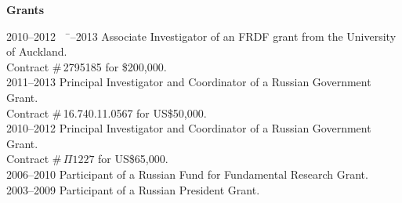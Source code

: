 \documentclass[12pt]{article}
\begin{document}
\centerline{\bf Grants}

\begin{tabbing}
2010--2012 \ \ \= --2013       \> Associate Investigator of an FRDF grant from the University of Auckland.\\
		\> Contract \#\,2795185 for \$200,000.\\
2011--2013       \> Principal Investigator and Coordinator of a Russian Government Grant.\\
		 \> Contract \#\,16.740.11.0567 for US\$50,000.\\
2010--2012       \> Principal Investigator and Coordinator of a Russian Government Grant.\\
		 \> Contract \#\,$\Pi1227$ for US\$65,000.\\
2006--2010       \> Participant of a Russian Fund for Fundamental Research Grant.\\
2003--2009      \> Participant of a Russian President Grant.\\
\end{tabbing}

\iftoggle{full}{
\centerline{\bf Travel Grants}
\begin{tabbing}
2010--2012 \ \ \= \kill
2012--2013        \> School of Computing, National University of Singapore\\
2011                  \> University of Chicago, University of Wisconsin--Madison, and Cornell University\\
2011                  \> Participation in the Logic Colloquium 2011\\
2010                  \> Participation in the Logic Colloquium 2010\\
2010                  \> Participation in the Computability in Europe 2010\\
2009                  \> University of Notre Dame, Cornell University, and NYC University\\
2009                  \> Participation in the Logic Colloquium 2009\\
2008                  \> Participation in the Computability in Europe 2008\\
2008                  \> Participation in the Summer School Marktoberdorf 2008\\
2007                  \> Participation in the Logic Colloquium 2007\\
2006                  \> Participation in the Computability in Europe 2006\\
\end{tabbing}
}{}
\end{document}
